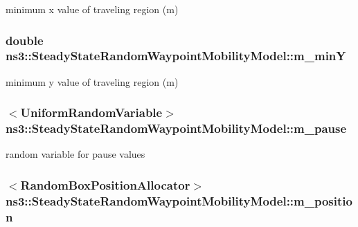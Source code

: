 minimum x value of traveling region (m) 

\subsubsection[{\texorpdfstring{m\+\_\+minY}{m_minY}}]{\setlength{\rightskip}{0pt plus 5cm}double ns3\+::\+Steady\+State\+Random\+Waypoint\+Mobility\+Model\+::m\+\_\+minY\hspace{0.3cm}{\ttfamily [private]}}\hypertarget{classns3_1_1SteadyStateRandomWaypointMobilityModel_aa208b74985a3dfd89206e0fbf582186f}{}\label{classns3_1_1SteadyStateRandomWaypointMobilityModel_aa208b74985a3dfd89206e0fbf582186f}


minimum y value of traveling region (m) 

\subsubsection[{\texorpdfstring{m\+\_\+pause}{m_pause}}]{$<${\bf Uniform\+Random\+Variable}$>$ ns3\+::\+Steady\+State\+Random\+Waypoint\+Mobility\+Model\+::m\+\_\+pause\hspace{0.3cm}{\ttfamily [private]}}\hypertarget{classns3_1_1SteadyStateRandomWaypointMobilityModel_a46c20c9985a424aba9486dfb34a39579}{}\label{classns3_1_1SteadyStateRandomWaypointMobilityModel_a46c20c9985a424aba9486dfb34a39579}


random variable for pause values 

\subsubsection[{\texorpdfstring{m\+\_\+position}{m_position}}]{$<${\bf Random\+Box\+Position\+Allocator}$>$ ns3\+::\+Steady\+State\+Random\+Waypoint\+Mobility\+Model\+::m\+\_\+position\hspace{0.3cm}{\ttfamily [private]}}\hypertarget{classns3_1_1SteadyStateRandomWaypointMobilityModel_af99538149102b89057259be27bd6d59e}{}\label{classns3_1_1SteadyStateRandomWaypointMobilityModel_af99538149102b89057259be27bd6d59e}


